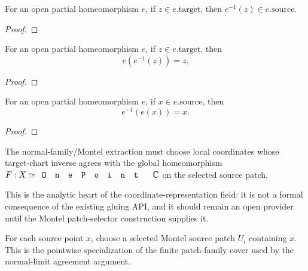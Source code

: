 \begin{lemma}
\label{lem:mathlib-open-partial-homeomorph-map-target}
For an open partial homeomorphism \(e\), if \(z\in e.\mathrm{target}\), then
\(e^{-1}(z)\in e.\mathrm{source}\).
\leanok
\end{lemma}
\begin{proof}\leanok\end{proof}

\begin{lemma}
\label{lem:mathlib-open-partial-homeomorph-right-inv}
For an open partial homeomorphism \(e\), if \(z\in e.\mathrm{target}\), then
\[
  e(e^{-1}(z)) = z.
\]
\leanok
\end{lemma}
\begin{proof}\leanok\end{proof}

\begin{lemma}
\label{lem:mathlib-open-partial-homeomorph-left-inv}
For an open partial homeomorphism \(e\), if \(x\in e.\mathrm{source}\), then
\[
  e^{-1}(e(x)) = x.
\]
\leanok
\end{lemma}
\begin{proof}\leanok\end{proof}

\begin{lemma}
\label{lem:montel-selector-normal-limit-agrees-with-uniformization}
The normal-family/Montel extraction must choose local coordinates whose
target-chart inverse agrees with the global homeomorphism \(F:X\simeq
\code{OnePoint}\,\C\) on the selected source patch.

This is the analytic heart of the coordinate-representation field: it is not a
formal consequence of the existing gluing API, and it should remain an open
provider until the Montel patch-selector construction supplies it.
\end{lemma}

\begin{lemma}
\label{lem:montel-selector-normal-limit-source-patch}
For each source point \(x\), choose a selected Montel source patch \(U_i\)
containing \(x\).  This is the pointwise specialization of the finite
patch-family cover used by the normal-limit agreement argument.
\end{lemma}

